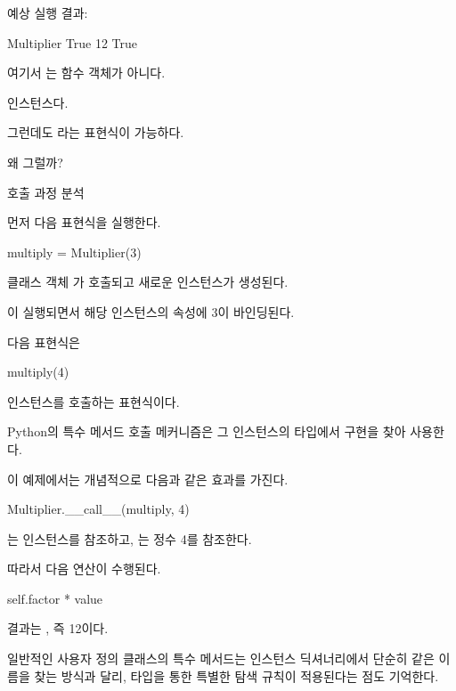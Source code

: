 예상 실행 결과:

\begin{dhkzsh}
Multiplier
True
12
True
\end{dhkzsh}

여기서 는 함수 객체가 아니다.

 인스턴스다.

그런데도 라는 표현식이 가능하다.

왜 그럴까?

\begin{dhknote}
\begin{dhksmry}[centered]
호출 과정 분석
\end{dhksmry}
\end{dhknote}

먼저 다음 표현식을 실행한다.

\begin{dhkcode}
multiply = Multiplier(3)
\end{dhkcode}

클래스 객체 가 호출되고 새로운 인스턴스가 생성된다.

이 실행되면서 해당 인스턴스의  속성에 3이 바인딩된다.

다음 표현식은

\begin{dhkcode}
multiply(4)
\end{dhkcode}

 인스턴스를 호출하는 표현식이다.

Python의 특수 메서드 호출 메커니즘은 그 인스턴스의 타입에서  구현을 찾아 사용한다.

이 예제에서는 개념적으로 다음과 같은 효과를 가진다.

\begin{dhkcode}
Multiplier.__call__(multiply, 4)
\end{dhkcode}

는  인스턴스를 참조하고, 는 정수 4를 참조한다.

따라서 다음 연산이 수행된다.

\begin{dhkcode}
self.factor * value
\end{dhkcode}

결과는 , 즉 12이다.

일반적인 사용자 정의 클래스의 특수 메서드는 인스턴스 딕셔너리에서 단순히 같은 이름을 찾는 방식과 달리, 타입을 통한 특별한 탐색 규칙이 적용된다는 점도 기억한다.

